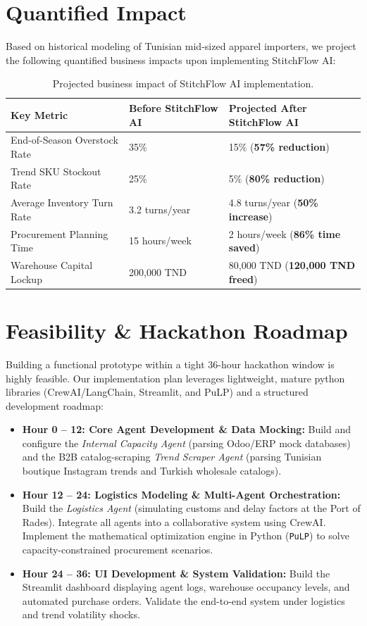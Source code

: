 \documentclass[11pt,a4paper]{article}
\begin{document}
\section{Quantified Impact}
Based on historical modeling of Tunisian mid-sized apparel importers, we project the following quantified business impacts upon implementing StitchFlow AI:
\begin{table}[h!]
\centering
\color{bodytext}
\begin{tabular}{lll}
\toprule
\textbf{Key Metric} & \textbf{Before StitchFlow AI} & \textbf{Projected After StitchFlow AI} \\
\midrule
End-of-Season Overstock Rate & 35\% & 15\% (\textbf{57\% reduction}) \\
Trend SKU Stockout Rate & 25\% & 5\% (\textbf{80\% reduction}) \\
Average Inventory Turn Rate & 3.2 turns/year & 4.8 turns/year (\textbf{50\% increase}) \\
Procurement Planning Time & 15 hours/week & 2 hours/week (\textbf{86\% time saved}) \\
Warehouse Capital Lockup & 200,000 TND & 80,000 TND (\textbf{120,000 TND freed}) \\
\bottomrule
\end{tabular}
\caption{Projected business impact of StitchFlow AI implementation.}
\end{table}

\section{Feasibility \& Hackathon Roadmap}
Building a functional prototype within a tight 36-hour hackathon window is highly feasible. Our implementation plan leverages lightweight, mature python libraries (CrewAI/LangChain, Streamlit, and PuLP) and a structured development roadmap:

\begin{itemize}
    \item \textbf{Hour 0 -- 12: Core Agent Development \& Data Mocking:} Build and configure the \textit{Internal Capacity Agent} (parsing Odoo/ERP mock databases) and the B2B catalog-scraping \textit{Trend Scraper Agent} (parsing Tunisian boutique Instagram trends and Turkish wholesale catalogs).
    \item \textbf{Hour 12 -- 24: Logistics Modeling \& Multi-Agent Orchestration:} Build the \textit{Logistics Agent} (simulating customs and delay factors at the Port of Rades). Integrate all agents into a collaborative system using CrewAI. Implement the mathematical optimization engine in Python (\texttt{PuLP}) to solve capacity-constrained procurement scenarios.
    \item \textbf{Hour 24 -- 36: UI Development \& System Validation:} Build the Streamlit dashboard displaying agent logs, warehouse occupancy levels, and automated purchase orders. Validate the end-to-end system under logistics and trend volatility shocks.
\end{itemize}
\end{document}
